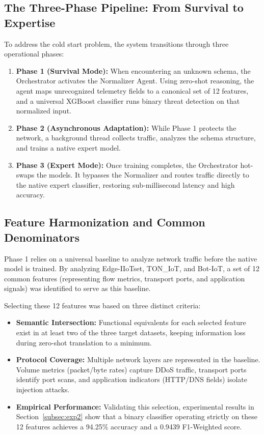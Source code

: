 \documentclass[conference]{IEEEtran}
\begin{document}
\subsection{The Three-Phase Pipeline: From Survival to Expertise}

To address the cold start problem, the system transitions through three operational phases:

\begin{enumerate}
    \item \textbf{Phase 1 (Survival Mode):} When encountering an unknown schema, the Orchestrator activates the Normalizer Agent. Using zero-shot reasoning, the agent maps unrecognized telemetry fields to a canonical set of 12 features, and a universal XGBoost classifier runs binary threat detection on that normalized input.
    \item \textbf{Phase 2 (Asynchronous Adaptation):} While Phase 1 protects the network, a background thread collects traffic, analyzes the schema structure, and trains a native expert model.
    \item \textbf{Phase 3 (Expert Mode):} Once training completes, the Orchestrator hot-swaps the models. It bypasses the Normalizer and routes traffic directly to the native expert classifier, restoring sub-millisecond latency and high accuracy.
\end{enumerate}

\subsection{Feature Harmonization and Common Denominators}
Phase 1 relies on a universal baseline to analyze network traffic before the native model is trained. By analyzing Edge-IIoTset, TON\_IoT, and Bot-IoT, a set of 12 common features (representing flow metrics, transport ports, and application signals) was identified to serve as this baseline.

Selecting these 12 features was based on three distinct criteria:
\begin{itemize}
    \item \textbf{Semantic Intersection:} Functional equivalents for each selected feature exist in at least two of the three target datasets, keeping information loss during zero-shot translation to a minimum.
    \item \textbf{Protocol Coverage:} Multiple network layers are represented in the baseline. Volume metrics (packet/byte rates) capture DDoS traffic, transport ports identify port scans, and application indicators (HTTP/DNS fields) isolate injection attacks.
    \item \textbf{Empirical Performance:} Validating this selection, experimental results in Section~\ref{subsec:exp2} show that a binary classifier operating strictly on these 12 features achieves a 94.25\% accuracy and a 0.9439 F1-Weighted score.
\end{itemize}
\end{document}
